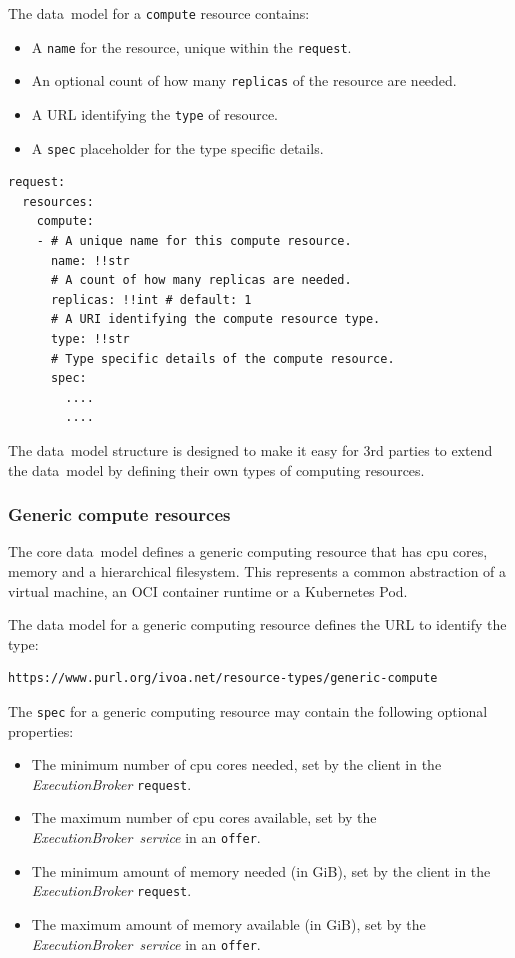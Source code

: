 \documentclass[11pt,a4paper]{ivoa}
\newcommand{\datamodel} {data~model}
\newcommand{\execbrokerclass} {\textit{ExecutionBroker}}
\newcommand{\execbrokerservice}[1] {\textit{ExecutionBroker~service#1}}
\newcommand{\kubernetes} {Kubernetes}
\newcommand{\codeword}[1] {\texttt{#1}}
\begin{document}
The \datamodel{} for a \codeword{compute} resource contains:
\begin{itemize}
    \item A \codeword{name} for the resource, unique within the \codeword{request}.
    \item An optional count of how many \codeword{replicas} of the resource are needed.
    \item A URL identifying the \codeword{type} of resource.
    \item A \codeword{spec} placeholder for the type specific details.
\end{itemize}

\begin{lstlisting}[]
request:
  resources:
    compute:
    - # A unique name for this compute resource.
      name: !!str
      # A count of how many replicas are needed.
      replicas: !!int # default: 1
      # A URI identifying the compute resource type.
      type: !!str
      # Type specific details of the compute resource.
      spec:
        ....
        ....
\end{lstlisting}

The \datamodel{} structure is designed to make it easy for 3rd parties
to extend the \datamodel{} by defining their own types of computing
resources.

\subsubsection{Generic compute resources}
\label{datamodel-generic-compute}

The core \datamodel{} defines a generic computing resource
that has cpu cores, memory and a hierarchical filesystem.
This represents a common abstraction of a virtual machine,
an OCI container runtime or a \kubernetes{} Pod.

The data model for a generic computing resource defines the URL to identify
the type:
\begin{lstlisting}[]
https://www.purl.org/ivoa.net/resource-types/generic-compute
\end{lstlisting}
\hfill \break
The \codeword{spec} for a generic computing resource may contain the following optional properties:
\begin{itemize}
    \item The minimum number of cpu cores needed, set by the client in the \execbrokerclass{} \codeword{request}.
    \item The maximum number of cpu cores available, set by the \execbrokerservice{} in an \codeword{offer}.
    \item The minimum amount of memory needed (in GiB), set by the client in the \execbrokerclass{} \codeword{request}.
    \item The maximum amount of memory available (in GiB), set by the \execbrokerservice{} in an \codeword{offer}.
\end{itemize}
\end{document}
